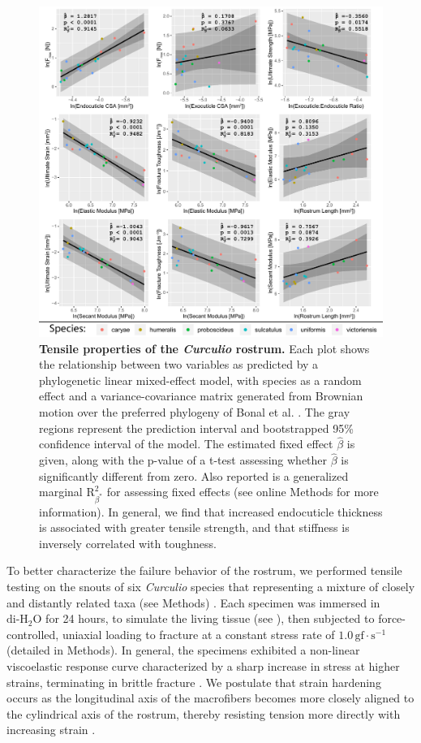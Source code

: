 \documentclass[twocolumn, linenumbers, superscriptaddress, nofootinbib]{revtex4-1}
\begin{document}
		\begin{figure}
			\centering
			\includegraphics[width=180mm]{fig4.pdf}
			\caption{\textbf{Tensile properties of the \textit{Curculio} rostrum.}
				Each plot shows the relationship between two variables as predicted by a phylogenetic linear mixed-effect model, with species as a random effect and a variance-covariance matrix generated from Brownian motion over the preferred phylogeny of Bonal et al. \cite{Bonal2016}.
				The gray regions represent the prediction interval and bootstrapped 95\% confidence interval of the model.
				The estimated fixed effect $\hat{\beta}$ is given, along with the p-value of a t-test assessing whether $\hat{\beta}$ is significantly different from zero.
				Also reported is a generalized marginal $\text{R}^2_{\beta^*}$ for assessing fixed effects (see online Methods for more information).
				In general, we find that increased endocuticle thickness is associated with greater tensile strength, and that stiffness is inversely correlated with toughness.
			}
			\label{fig::tensile}
		\end{figure}		
	
		To better characterize the failure behavior of the rostrum, we performed tensile testing on the snouts of six \textit{Curculio} species that representing a mixture of closely and distantly related taxa (see Methods) \cite{Hughes2004phylo, Hughes2004eco, Bonal2016, Bonal2011}.
		Each specimen was immersed in $\text{di-H}_2\text{O}$ for 24 hours, to simulate the living tissue (see \cite{Klocke2011}), then subjected to force-controlled, uniaxial loading to fracture at a constant stress rate of $1.0\,\text{gf}\cdot\text{s}^{-1}$ (detailed in Methods).
		In general, the specimens exhibited a non-linear viscoelastic response curve characterized by a sharp increase in stress at higher strains, terminating in brittle fracture \cite{Mihai2017}.
		We postulate that strain hardening occurs as the longitudinal axis of the macrofibers becomes more closely aligned to the cylindrical axis of the rostrum, thereby resisting tension more directly with increasing strain \cite{Munster2013}.
		
\end{document}

